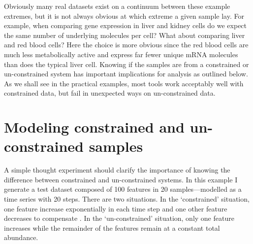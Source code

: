 \documentclass[onecolumn]{book}
\theoremstyle{definition}
\theoremstyle{definition}
\theoremstyle{definition}
\theoremstyle{remark}
\begin{document}
Obviously many real datasets exist on a continuum between these example
extremes, but it is not always obvious at which extreme a given sample
lay. For example, when comparing gene expression in liver and kidney
cells do we expect the same number of underlying molecules per cell?
What about comparing liver and red blood cells? Here the choice is more
obvious since the red blood cells are much less metabolically active and
express far fewer unique mRNA molecules than does the typical liver
cell. Knowing if the samples are from a constrained or un-constrained
system has important implications for analysis as outlined below. As we
shall see in the practical examples, most tools work acceptably well
with constrained data, but fail in unexpected ways on un-constrained
data.

\hypertarget{modeling-constrained-and-un-constrained-samples}{%
\section{Modeling constrained and un-constrained
samples}\label{modeling-constrained-and-un-constrained-samples}}

A simple thought experiment should clarify the importance of knowing the
difference between constrained and un-constrained systems. In this
example I generate a test dataset composed of 100 features in 20
samples---modelled as a time series with 20 steps. There are two
situations. In the `constrained' situation, one feature increase
exponentially in each time step and one other feature decreases to
compensate . In the `un-constrained' situation, only one feature
increases while the remainder of the features remain at a constant total
abundance.
\end{document}
